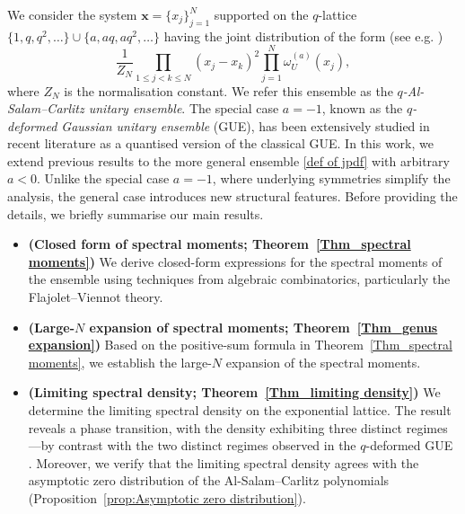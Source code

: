 \documentclass{amsart}
\def\bfs{\boldsymbol}
\theoremstyle{plain}
\theoremstyle{remark}
\numberwithin{equation}{section}
\begin{document}
We consider the system $\bfs{x}=\{x_j\}_{j=1}^N$ supported on the $q$-lattice $\{1,q,q^2,\dots \} \cup \{a,aq,aq^2,\dots \}$ having the joint distribution of the form (see e.g. \cite{Ol21,BF25a})
\begin{equation} \label{def of jpdf}
\frac{1}{Z_N}\prod_{1\le j<k \le N}(x_j-x_k)^2 \prod_{j=1}^N \omega_U^{(a)}(x_j), 
\end{equation}
where $Z_N$ is the normalisation constant. We refer this ensemble as the \textit{$q$-Al-Salam--Carlitz unitary ensemble}.
The special case $a = -1$, known as the \textit{$q$-deformed Gaussian unitary ensemble} (GUE), has been extensively studied in recent literature  \cite{BFO24,FLSY23,Co21,CCO20, Le05, LSYF23,MPS20} as a quantised version of the classical GUE. 
In this work, we extend previous results to the more general ensemble \eqref{def of jpdf} with arbitrary \( a < 0 \). Unlike the special case \( a = -1 \), where underlying symmetries simplify the analysis, the general case introduces new structural features. Before providing the details, we briefly summarise our main results. 


\begin{itemize}
    \item \textbf{(Closed form of spectral moments; Theorem~\ref{Thm_spectral moments})} We derive closed-form expressions for the spectral moments of the ensemble using techniques from algebraic combinatorics, particularly the Flajolet--Viennot theory.
    \smallskip
    \item \textbf{(Large-$N$ expansion of spectral moments; Theorem~\ref{Thm_genus expansion})} Based on the positive-sum formula in Theorem~\ref{Thm_spectral moments}, we establish the large-$N$ expansion of the spectral moments. 
    \smallskip
    \item \textbf{(Limiting spectral density; Theorem~\ref{Thm_limiting density})} We determine the limiting spectral density on the exponential lattice. The result reveals a phase transition, with the density exhibiting three distinct regimes---by contrast with the two distinct regimes observed in the \( q \)-deformed GUE \cite{BFO24}. Moreover, we verify that the limiting spectral density agrees with the asymptotic zero distribution of the Al-Salam--Carlitz polynomials (Proposition~\ref{prop:Asymptotic zero distribution}).
\end{itemize}
\end{document}
